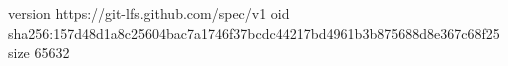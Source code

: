 version https://git-lfs.github.com/spec/v1
oid sha256:157d48d1a8c25604bac7a1746f37bcdc44217bd4961b3b875688d8e367c68f25
size 65632
